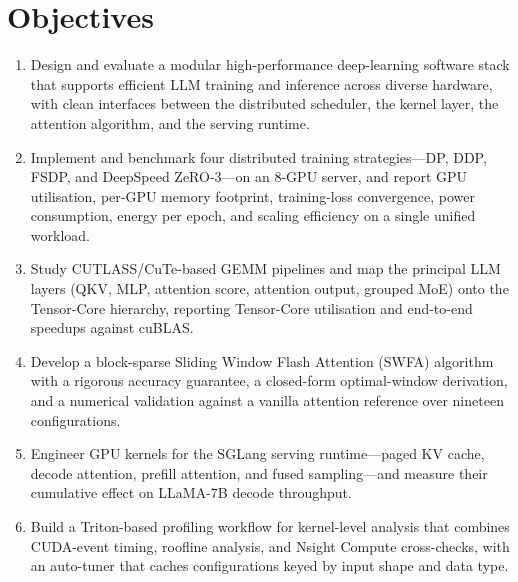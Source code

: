 \section{Objectives}\label{sec:intro_objectives}
\begin{enumerate}
    \item Design and evaluate a modular high-performance deep-learning
          software stack that supports efficient LLM training and
          inference across diverse hardware, with clean interfaces between
          the distributed scheduler, the kernel layer, the attention
          algorithm, and the serving runtime.
    \item Implement and benchmark four distributed training
          strategies---DP, DDP, FSDP, and DeepSpeed ZeRO-3---on an 8-GPU
          server, and report GPU utilisation, per-GPU memory footprint,
          training-loss convergence, power consumption, energy per epoch,
          and scaling efficiency on a single unified workload.
    \item Study CUTLASS/CuTe-based GEMM pipelines and map the principal
          LLM layers (QKV, MLP, attention score, attention output, grouped
          MoE) onto the Tensor-Core hierarchy, reporting Tensor-Core
          utilisation and end-to-end speedups against cuBLAS.
    \item Develop a block-sparse Sliding Window Flash Attention (SWFA)
          algorithm with a rigorous accuracy guarantee, a closed-form
          optimal-window derivation, and a numerical validation against a
          vanilla attention reference over nineteen configurations.
    \item Engineer GPU kernels for the SGLang serving runtime---paged KV
          cache, decode attention, prefill attention, and fused
          sampling---and measure their cumulative effect on LLaMA-7B
          decode throughput.
    \item Build a Triton-based profiling workflow for kernel-level
          analysis that combines CUDA-event timing, roofline analysis,
          and Nsight Compute cross-checks, with an auto-tuner that caches
          configurations keyed by input shape and data type.
\end{enumerate}

